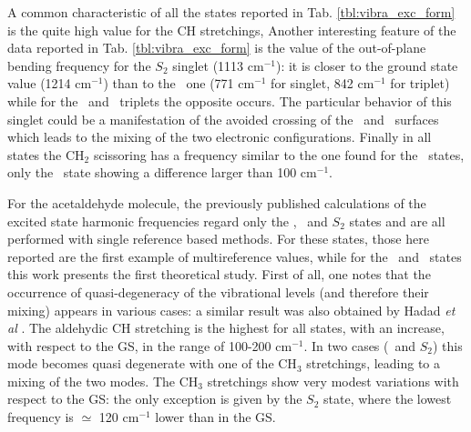 
A common characteristic of all the states reported in Tab.
\ref{tbl:vibra_exc_form} is the quite high value for the CH stretchings,
Another interesting feature of the data reported in Tab.
\ref{tbl:vibra_exc_form} is the value of the out-of-plane bending
frequency for the $S_2$ singlet (1113 cm$^{-1}$): it is closer to the ground
state value (1214 cm$^{-1}$) than to the \npi\ one (771 cm$^{-1}$ for
singlet, 842 cm$^{-1}$ for triplet) while for the \pipi\ and \spi\ triplets
the opposite occurs. The particular behavior of this singlet could be a
manifestation of the avoided crossing of the \pipi\ and \spi\ surfaces which
leads to the mixing of the two electronic configurations.  Finally in all
states the CH$_2$ scissoring has a frequency similar to the one found for
the \npi\ states, only the \tpipi\ state showing a difference larger than
100 cm$^{-1}$.



For the acetaldehyde molecule, the previously published calculations of the
excited state harmonic frequencies regard only the \snpi, \tnpi\ and $S_2$
states and are all performed with single reference based methods.  For these
states, those here reported are the first example of multireference values,
while for the \tpipi\ and \tspi\ states this work presents the first
theoretical study.  First of all, one notes that the occurrence of
quasi-degeneracy of the vibrational levels (and therefore their mixing)
appears in various cases: a similar result was also obtained by Hadad {\it
et al} \cite{jpc-97-4293-1993}.  The aldehydic CH stretching is the highest
for all states, with an increase, with respect to the GS, in the range of
100-200 cm$^{-1}$. In two cases (\tnpi\ and $S_2$) this mode becomes quasi
degenerate with one of the CH$_3$ stretchings, leading to a mixing of the
two modes.  The CH$_3$ stretchings show very modest variations with respect
to the GS: the only exception is given by the $S_2$ state, where the lowest
frequency is $\simeq$ 120 cm$^{-1}$ lower than in the GS.

